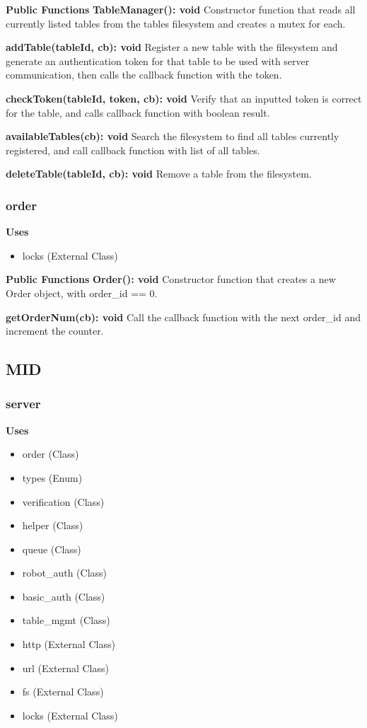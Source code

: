 \documentclass [10pt]{article}
\begin{document}
\textbf{Public Functions}
\textbf{TableManager(): void}
Constructor function that reads all currently listed tables from the tables filesystem and creates a mutex for each.

\textbf{addTable(tableId, cb): void}
Register a new table with the filesystem and generate an authentication token for that table to be used with server communication, then calls the callback function with the token.

\textbf{checkToken(tableId, token, cb): void}
Verify that an inputted token is correct for the table, and calls callback function with boolean result.

\textbf{availableTables(cb): void}
Search the filesystem to find all tables currently registered, and call callback function with list of all tables.

\textbf{deleteTable(tableId, cb): void}
Remove a table from the filesystem.

\subsubsection{order}
\textbf{Uses}
\begin{itemize}
	\item locks (External Class)
\end{itemize}

\textbf{Public Functions}
\textbf{Order(): void}
Constructor function that creates a new Order object, with order\_id == 0.

\textbf{getOrderNum(cb): void}
Call the callback function with the next order\_id and increment the counter.

\subsection{MID}
\subsubsection{server}
\textbf{Uses}
\begin{itemize}
	\item order (Class)
	\item types (Enum)
	\item verification (Class)
	\item helper (Class)
	\item queue (Class)
	\item robot\_auth (Class)
	\item basic\_auth (Class)
	\item table\_mgmt (Class)
	\item http (External Class)
	\item url (External Class)
	\item fs (External Class)
	\item locks (External Class)
\end{itemize}
\end{document}
